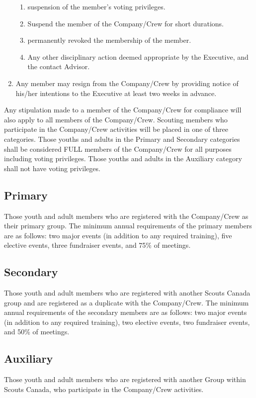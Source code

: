 \begin{enumerate}
    \begin{enumerate}
        \item suspension of the member's voting privileges.
        \item Suspend the member of the Company/Crew for short durations.
        \item permanently revoked the membership of the member.
        \item Any other disciplinary action deemed appropriate by the Executive, and the contact Advisor.
    \end{enumerate}
    \item Any member may resign from the Company/Crew by providing notice of his/her intentions to the Executive at least two weeks in advance.
\end{enumerate}
Any stipulation made to a member of the Company/Crew for compliance will also apply to all members of the Company/Crew.
Scouting members who participate in the Company/Crew activities will be placed in one of three categories.
Those youths and adults in the Primary and Secondary categories shall be considered FULL members of the Company/Crew for all purposes including voting privileges.
Those youths and adults in the Auxiliary category shall not have voting privileges.

\subsection{Primary}\label{subsec:primary}
Those youth and adult members who are registered with the Company/Crew as their primary group.
The minimum annual requirements of the primary members are as follows: two major events (in addition to any required training), five elective events, three fundraiser events, and 75\% of meetings.

\subsection{Secondary}\label{subsec:secondary}
Those youth and adult members who are registered with another Scouts Canada group and are registered as a duplicate with the Company/Crew.
The minimum annual requirements of the secondary members are as follows: two major events (in addition to any required training), two elective events, two fundraiser events, and 50\% of meetings.

\subsection{Auxiliary}\label{subsec:auxiliary}
Those youth and adult members who are registered with another Group within Scouts Canada, who participate in the Company/Crew activities.